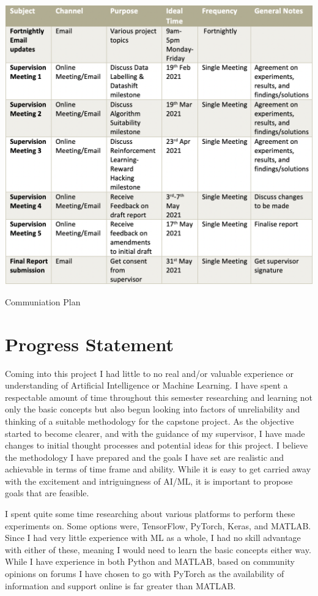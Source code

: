 \documentclass[a4paper,12pt]{report}
\begin{document}
\begin{table}[h]
    \centering
    \includegraphics[width=\textwidth]{communication plan.png}
    \caption{Communiation Plan}
    \label{tab:comm}
\end{table}

\chapter{Progress Statement}
\enlargethispage{\baselineskip}
Coming into this project I had little to no real and/or valuable experience or understanding of Artificial Intelligence or Machine Learning. 
I have spent a respectable amount of time throughout this semester researching and learning not only the basic concepts but also begun looking into factors of unreliability and thinking of a suitable methodology for the capstone project.
As the objective started to become clearer, and with the guidance of my supervisor, I have made changes to initial thought processes and potential ideas for this project. 
I believe the methodology I have prepared and the goals I have set are realistic and achievable in terms of time frame and ability. 
While it is easy to get carried away with the excitement and intriguingness of AI/ML, it is important to propose goals that are feasible.

I spent quite some time researching about various platforms to perform these experiments on. Some options were, TensorFlow, PyTorch, Keras, and MATLAB. 
Since I had very little experience with ML as a whole, I had no skill advantage with either of these, meaning I would need to learn the basic concepts either way. 
While I have experience in both Python and MATLAB, based on community opinions on forums I have chosen to go with PyTorch as the availability of information and support online is far greater than MATLAB.
\end{document}
